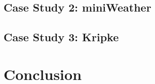 \documentclass[sigconf, table]{acmart}
\begin{document}
\subsection{Case Study 2: miniWeather}

\subsection{Case Study 3: Kripke}


\section{Conclusion}
\end{document}
